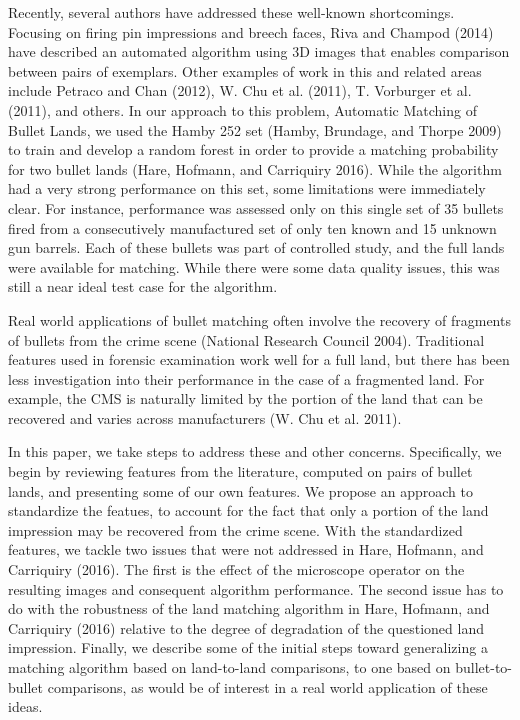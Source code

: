 \documentclass[12pt,]{article}
\theoremstyle{definition}
\theoremstyle{definition}
\theoremstyle{definition}
\theoremstyle{remark}
\begin{document}
Recently, several authors have addressed these well-known shortcomings.
Focusing on firing pin impressions and breech faces, Riva and Champod
(2014) have described an automated algorithm using 3D images that
enables comparison between pairs of exemplars. Other examples of work in
this and related areas include Petraco and Chan (2012), W. Chu et al.
(2011), T. Vorburger et al. (2011), and others. In our approach to this
problem, Automatic Matching of Bullet Lands, we used the Hamby 252 set
(Hamby, Brundage, and Thorpe 2009) to train and develop a random forest
in order to provide a matching probability for two bullet lands (Hare,
Hofmann, and Carriquiry 2016). While the algorithm had a very strong
performance on this set, some limitations were immediately clear. For
instance, performance was assessed only on this single set of 35 bullets
fired from a consecutively manufactured set of only ten known and 15
unknown gun barrels. Each of these bullets was part of controlled study,
and the full lands were available for matching. While there were some
data quality issues, this was still a near ideal test case for the
algorithm.

Real world applications of bullet matching often involve the recovery of
fragments of bullets from the crime scene (National Research Council
2004). Traditional features used in forensic examination work well for a
full land, but there has been less investigation into their performance
in the case of a fragmented land. For example, the CMS is naturally
limited by the portion of the land that can be recovered and varies
across manufacturers (W. Chu et al. 2011).

In this paper, we take steps to address these and other concerns.
Specifically, we begin by reviewing features from the literature,
computed on pairs of bullet lands, and presenting some of our own
features. We propose an approach to standardize the featues, to account
for the fact that only a portion of the land impression may be recovered
from the crime scene. With the standardized features, we tackle two
issues that were not addressed in Hare, Hofmann, and Carriquiry (2016).
The first is the effect of the microscope operator on the resulting
images and consequent algorithm performance. The second issue has to do
with the robustness of the land matching algorithm in Hare, Hofmann, and
Carriquiry (2016) relative to the degree of degradation of the
questioned land impression. Finally, we describe some of the initial
steps toward generalizing a matching algorithm based on land-to-land
comparisons, to one based on bullet-to-bullet comparisons, as would be
of interest in a real world application of these ideas.
\end{document}
